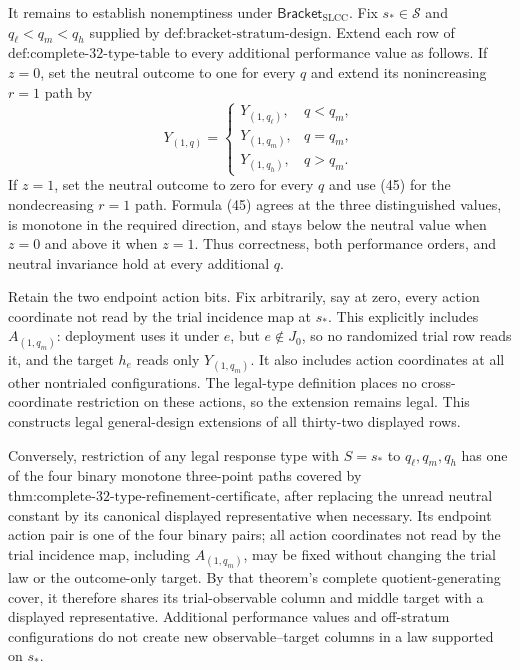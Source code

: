 It remains to establish nonemptiness under \(\mathsf{Bracket}_{\mathrm{SLCC}}\).  Fix \(s_*\in\mathcal S\) and \(q_\ell<q_m<q_h\) supplied by \(\text{def:bracket-stratum-design}\).  Extend each row of \(\text{def:complete-32-type-table}\) to every additional performance value as follows.  If \(z=0\), set the neutral outcome to one for every \(q\) and extend its nonincreasing \(r=1\) path by
\[
Y_{(1,q)}=
\begin{cases}
Y_{(1,q_\ell)},&q<q_m,\\
Y_{(1,q_m)},&q=q_m,\\
Y_{(1,q_h)},&q>q_m.
\end{cases}
\tag{45}
\]
If \(z=1\), set the neutral outcome to zero for every \(q\) and use (45) for the nondecreasing \(r=1\) path.  Formula (45) agrees at the three distinguished values, is monotone in the required direction, and stays below the neutral value when \(z=0\) and above it when \(z=1\).  Thus correctness, both performance orders, and neutral invariance hold at every additional \(q\).

Retain the two endpoint action bits.  Fix arbitrarily, say at zero, every action coordinate not read by the trial incidence map at \(s_*\).  This explicitly includes \(A_{(1,q_m)}\): deployment uses it under \(e\), but \(e\notin J_0\), so no randomized trial row reads it, and the target \(h_e\) reads only \(Y_{(1,q_m)}\).  It also includes action coordinates at all other nontrialed configurations.  The legal-type definition places no cross-coordinate restriction on these actions, so the extension remains legal.  This constructs legal general-design extensions of all thirty-two displayed rows.

Conversely, restriction of any legal response type with \(S=s_*\) to \(q_\ell,q_m,q_h\) has one of the four binary monotone three-point paths covered by \(\text{thm:complete-32-type-refinement-certificate}\), after replacing the unread neutral constant by its canonical displayed representative when necessary.  Its endpoint action pair is one of the four binary pairs; all action coordinates not read by the trial incidence map, including \(A_{(1,q_m)}\), may be fixed without changing the trial law or the outcome-only target.  By that theorem's complete quotient-generating cover, it therefore shares its trial-observable column and middle target with a displayed representative.  Additional performance values and off-stratum configurations do not create new observable--target columns in a law supported on \(s_*\).

